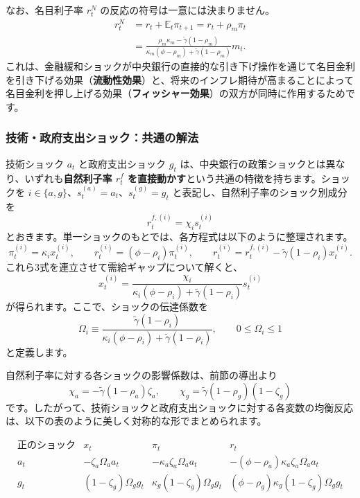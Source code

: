 \documentclass[
  japanese,
  lualatex,
  ja=standard,
  12pt,
  a4paper]{ltjsarticle}
\begin{document}
なお、名目利子率 \(r_t^N\) の反応の符号は一意には決まりません。 \[
\begin{aligned}
r_t^N &= r_t + \mathbb{E}_t \pi_{t+1}=r_t+\rho_m \pi_t\\
&=\frac{\rho_{m}\kappa_m-\tilde{\gamma}(1-\rho_{m})}{\kappa_m(\phi-\rho_{m})+\tilde{\gamma}(1-\rho_{m})}m_{t}.
\end{aligned}
\]
これは、金融緩和ショックが中央銀行の直接的な引き下げ操作を通じて名目金利を引き下げる効果（\textbf{流動性効果}）と、将来のインフレ期待が高まることによって名目金利を押し上げる効果（\textbf{フィッシャー効果}）の双方が同時に作用するためです。

\subsubsection{技術・政府支出ショック：共通の解法}\label{ux6280ux8853ux653fux5e9cux652fux51faux30b7ux30e7ux30c3ux30afux5171ux901aux306eux89e3ux6cd5}

技術ショック \(a_t\) と政府支出ショック \(g_t\)
は、中央銀行の政策ショックとは異なり、いずれも\textbf{自然利子率
\(r_t^f\) を直接動かす}という共通の特徴を持ちます。ショックを
\(i\in\{a,g\}\)、\(s_t^{(a)}=a_t\)、\(s_t^{(g)}=g_t\)
と表記し、自然利子率のショック別成分を \[
r_t^{f,(i)}=\chi_i s_t^{(i)}
\]
とおきます。単一ショックのもとでは、各方程式は以下のように整理されます。
\[
\pi_t^{(i)}=\kappa_i x_t^{(i)},
\qquad
r_t^{(i)}=(\phi-\rho_i)\pi_t^{(i)},
\qquad
r_t^{(i)}=r_t^{f,(i)}-\tilde{\gamma}(1-\rho_i)x_t^{(i)}.
\] これら3式を連立させて需給ギャップについて解くと、 \[
x_t^{(i)}
=
\frac{\chi_i}{\kappa_i(\phi-\rho_i)+\tilde{\gamma}(1-\rho_i)}s_t^{(i)}
\] が得られます。ここで、ショックの伝達係数を \[
\Omega_i
\equiv
\frac{\tilde{\gamma}(1-\rho_i)}
{\kappa_i(\phi-\rho_i)+\tilde{\gamma}(1-\rho_i)},
\qquad
0\leq\Omega_i\leq1
\] と定義します。

自然利子率に対する各ショックの影響係数は、前節の導出より \[
\chi_a=-\tilde{\gamma}(1-\rho_a)\zeta_a,
\qquad
\chi_g=\tilde{\gamma}(1-\rho_g)(1-\zeta_g)
\]
です。したがって、技術ショックと政府支出ショックに対する各変数の均衡反応は、以下の表のように美しく対称的な形でまとめられます。

\[
\begin{array}{c|ccc}
\text{正のショック}
&x_t&\pi_t&r_t\\ \hline
a_t
&-\zeta_a\Omega_a a_t
&-\kappa_a\zeta_a\Omega_a a_t
&-(\phi-\rho_a)\kappa_a\zeta_a\Omega_a a_t\\[3pt]
g_t
&(1-\zeta_g)\Omega_g g_t
&\kappa_g(1-\zeta_g)\Omega_g g_t
&(\phi-\rho_g)\kappa_g(1-\zeta_g)\Omega_g g_t
\end{array}
\]
\end{document}
